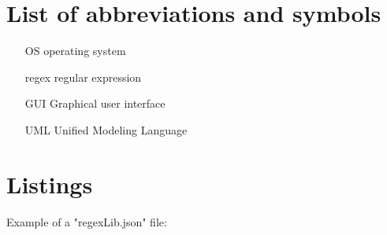 \documentclass[a4paper,twoside,12pt]{book}
\begin{document}
\begin{appendices} 


 

\chapter*{List of abbreviations and symbols}

\begin{itemize}
\item[OS] operating system
\item[regex] regular expression
\item[GUI] Graphical user interface
\item[UML] Unified Modeling Language 
\end{itemize}


\chapter*{Listings}

   
Example of a "regexLib.json" file:


\end{appendices}
\end{document}

